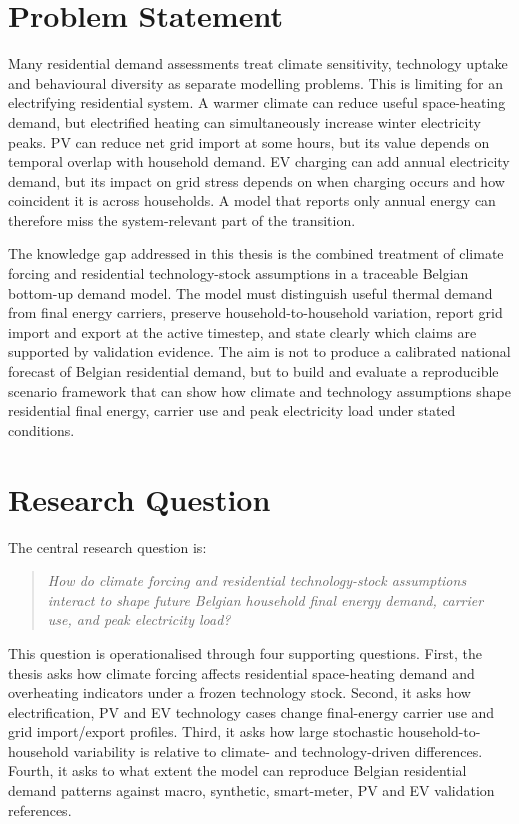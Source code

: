 \section{Problem Statement}

Many residential demand assessments treat climate sensitivity, technology uptake and behavioural diversity as separate modelling problems. This is limiting for an electrifying residential system. A warmer climate can reduce useful space-heating demand, but electrified heating can simultaneously increase winter electricity peaks. PV can reduce net grid import at some hours, but its value depends on temporal overlap with household demand. EV charging can add annual electricity demand, but its impact on grid stress depends on when charging occurs and how coincident it is across households. A model that reports only annual energy can therefore miss the system-relevant part of the transition.

The knowledge gap addressed in this thesis is the combined treatment of climate forcing and residential technology-stock assumptions in a traceable Belgian bottom-up demand model. The model must distinguish useful thermal demand from final energy carriers, preserve household-to-household variation, report grid import and export at the active timestep, and state clearly which claims are supported by validation evidence. The aim is not to produce a calibrated national forecast of Belgian residential demand, but to build and evaluate a reproducible scenario framework that can show how climate and technology assumptions shape residential final energy, carrier use and peak electricity load under stated conditions.

\newpage
\section{Research Question}

The central research question is:

\begin{quote}\itshape
How do climate forcing and residential technology-stock assumptions interact to shape future Belgian household final energy demand, carrier use, and peak electricity load?
\end{quote}

This question is operationalised through four supporting questions. First, the thesis asks how climate forcing affects residential space-heating demand and overheating indicators under a frozen technology stock. Second, it asks how electrification, PV and EV technology cases change final-energy carrier use and grid import/export profiles. Third, it asks how large stochastic household-to-household variability is relative to climate- and technology-driven differences. Fourth, it asks to what extent the model can reproduce Belgian residential demand patterns against macro, synthetic, smart-meter, PV and EV validation references.

